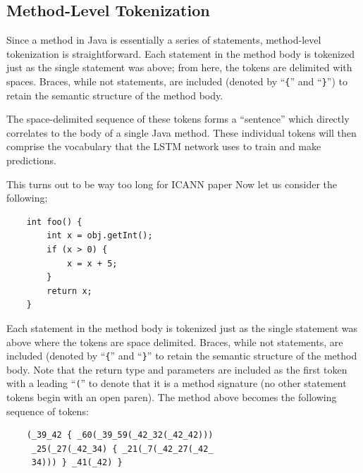 \documentclass[runningheads,a4paper]{llncs}
\begin{document}
\subsection{Method-Level Tokenization}

Since a method in Java is essentially a series of statements, method-level
tokenization is straightforward.
Each statement in the method body is tokenized just as the single statement 
was above; from here, the tokens are delimited with spaces. Braces, while not 
statements, are included (denoted by ``\texttt\{'' and
``\texttt\}'') to retain the semantic structure of the method body. 

The space-delimited sequence of these tokens forms a ``sentence'' which  
directly  correlates to the body of a single Java method. These individual  
tokens will then comprise the vocabulary that the LSTM network uses to train 
and make predictions.

\iffalse This turns out to be way too long for ICANN paper
Now let us consider the following;

\begin{verbatim}
    int foo() {
        int x = obj.getInt();
        if (x > 0) {
            x = x + 5;
        }
        return x;
    }
\end{verbatim}

Each statement in the method body is tokenized just as the single statement 
was above where the tokens are space delimited. Braces, while not 
statements, are included (denoted by ``\texttt\{'' and
``\texttt\}''  to retain the semantic structure of the method body. 
Note that the return type and parameters are included as the first 
token with a leading ``\texttt('' to denote that it is a method
signature (no other statement tokens begin with an open paren).
The method above becomes the following sequence of tokens:

\begin{verbatim}
    (_39_42 { _60(_39_59(_42_32(_42_42)))
     _25(_27(_42_34) { _21(_7(_42_27(_42_
     34))) } _41(_42) } 
\end{verbatim}
\end{document}

